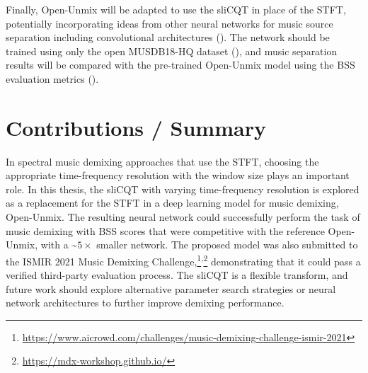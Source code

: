 \documentclass[letter,12pt]{article}
\begin{document}
Finally, Open-Unmix will be adapted to use the sliCQT in place of the STFT, potentially incorporating ideas from other neural networks for music source separation including convolutional architectures (\cite{plumbley2}). The network should be trained using only the open MUSDB18-HQ dataset (\cite{musdb18hq}), and music separation results will be compared with the pre-trained Open-Unmix model using the BSS evaluation metrics (\cite{bss, sisec2018}).

\section{Contributions / Summary}

In spectral music demixing approaches that use the STFT, choosing the appropriate time-frequency resolution with the window size plays an important role. In this thesis, the sliCQT with varying time-frequency resolution is explored as a replacement for the STFT in a deep learning model for music demixing, Open-Unmix. The resulting neural network could successfully perform the task of music demixing with BSS scores that were competitive with the reference Open-Unmix, with a \textasciitilde$5 \times$ smaller network. The proposed model was also submitted to the ISMIR 2021 Music Demixing Challenge,\footnote{\url{https://www.aicrowd.com/challenges/music-demixing-challenge-ismir-2021}}\textsuperscript{,}\footnote{\url{https://mdx-workshop.github.io/}} demonstrating that it could pass a verified third-party evaluation process. The sliCQT is a flexible transform, and future work should explore alternative parameter search strategies or neural network architectures to further improve demixing performance. 

\vfill
\clearpage %

\printbibheading[title={References},heading=bibnumbered]
\printbibliography[heading=none]

\vfill
\clearpage %
\end{document}
